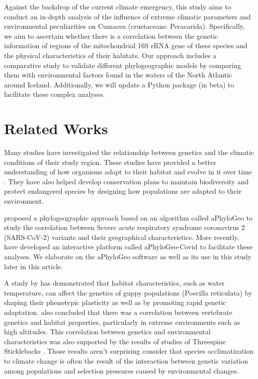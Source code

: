 Against the backdrop of the current climate emergency, this study aims to conduct an in-depth analysis of the influence of extreme climatic parameters and environmental peculiarities on Cumacea (crustaceans: Peracarida). Specifically, we aim to ascertain whether there is a correlation between the genetic information of regions of the mitochondrial 16S rRNA gene of these species and the physical characteristics of their habitats. Our approach includes a comparative study to validate different phylogeographic models by comparing them with environmental factors found in the waters of the North Atlantic around Iceland. Additionally, we will update a Python package (in beta) to facilitate these complex analyses.

\section{Related Works}\label{related-works}
Many studies have investigated the relationship between genetics and the climatic conditions of their study region. These studies have provided a better understanding of how organisms adapt to their habitat and evolve in it over time \citep{fc_genomic_2012}. They have also helped develop conservation plans to maintain biodiversity and protect endangered species by designing how populations are adapted to their environment.

\citep{koshkarov_phylogeography_2022} proposed a phylogeographic approach based on an algorithm called aPhyloGeo to study the correlation between Severe acute respiratory syndrome coronavirus 2 (SARS-CoV-2) variants and their geographical characteristics. More recently, \citep{li_aphylogeo-covid_2023} have developed an interactive platform called aPhyloGeo-Covid to facilitate these analyses.  We elaborate on the aPhyloGeo software as well as its use in this study later in this article.

A study by \citep{ghalambor_adaptive_2007} has demonstrated that habitat characteristics, such as water temperature, can affect the genetics of guppy populations (Poecilla reticulata) by shaping their phenotypic plasticity as well as by promoting rapid genetic adaptation. \citep{cheviron_genomic_2012} also concluded that there was a correlation between vertebrate genetics and habitat properties, particularly in extreme environments such as high altitudes. This correlation between genetics and environmental characteristics was also supported by the results of studies of Threespine Sticklebacks \citep{fc_genomic_2012}. Those results aren't surprising consider that species acclimatization to climate change is often the result of the interaction between genetic variation among populations and selection pressures caused by environmental changes.


